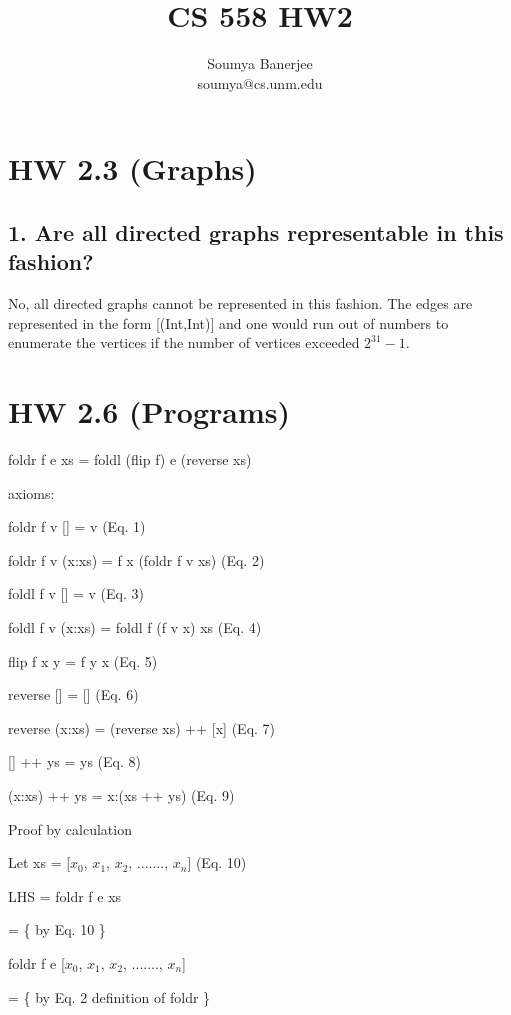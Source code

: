 \documentclass[twocolumn]{revtex4}
\begin{document}
\title{CS 558 HW2}
\author{Soumya Banerjee\\
soumya@cs.unm.edu\\}

\maketitle

\section{HW 2.3 (Graphs)}
\subsection{1. Are all directed graphs representable in this fashion?}

No, all directed graphs cannot be represented in this fashion. The edges are represented in the form [(Int,Int)] and one would run out of numbers to enumerate the vertices if the number of vertices exceeded $2^{31} - 1$.

\section{HW 2.6 (Programs)}


foldr f e xs = foldl (flip f) e (reverse xs)

axioms:


foldr f v [] = v					 (Eq. 1)

foldr f v (x:xs) = f x (foldr f v xs)		 (Eq. 2)

foldl f v [] = v					 (Eq. 3)

foldl f v (x:xs) = foldl f (f v x) xs		 (Eq. 4)


flip f x y = f y x					 (Eq. 5)

reverse [] = []					 (Eq. 6)

reverse (x:xs) = (reverse xs) ++ [x]	 (Eq. 7)

[] ++ ys = ys						(Eq. 8)

(x:xs) ++ ys = x:(xs ++ ys)			(Eq. 9)

Proof by calculation


Let xs = [$x_{0}$, $x_{1}$, $x_{2}$, ......., $x_{n}$]       (Eq. 10)

LHS = foldr f e xs

	= \{ by Eq. 10 \}

	foldr f e [$x_{0}$, $x_{1}$, $x_{2}$, ......., $x_{n}$] 	
	
	= \{ by Eq. 2 definition of foldr \}
	
\end{document}

